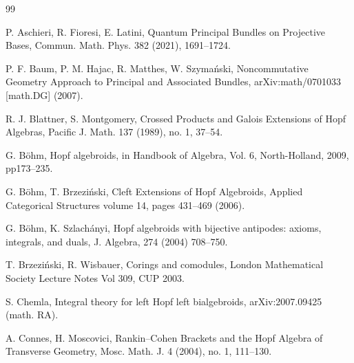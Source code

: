 \documentclass[a4paper,reqno]{amsart}
\numberwithin{equation}{section}
\theoremstyle{plain}
\theoremstyle{remark}
\numberwithin{equation}{section}
\begin{document}
\begin{thebibliography}{99}







P. Aschieri, R. Fioresi, E. Latini,
{Quantum Principal Bundles on Projective Bases},
Commun. Math. Phys. 382 (2021), 1691--1724.


P. F. Baum, P. M. Hajac, R. Matthes, W. Szyma{\'n}ski,
{Noncommutative Geometry Approach to Principal and Associated Bundles},
arXiv:math/0701033 [math.DG] (2007).

R. J. Blattner, S. Montgomery,
{Crossed Products and Galois Extensions of Hopf Algebras},
Pacific J. Math. 137 (1989), no. 1, 37--54.


G. B\"ohm,
{Hopf algebroids}, in Handbook of Algebra, Vol. 6,
North-Holland, 2009, pp173--235.

G. B\"ohm, T. Brzezi\'nski,
{Cleft Extensions of Hopf Algebroids}, Applied Categorical Structures volume 14, pages 431--469 (2006).

G. B\"ohm, K. Szlach\'anyi,
{Hopf algebroids with bijective antipodes:
axioms, integrals, and duals}, J. Algebra, 274 (2004) 708--750.

T. Brzezi\'nski, R. Wisbauer,
{Corings and comodules},
London Mathematical Society Lecture Notes Vol 309, CUP 2003.

S. Chemla,
{Integral theory for left Hopf left bialgebroids},
arXiv:2007.09425 (math. RA).

A. Connes, H. Moscovici,
{Rankin--Cohen Brackets and the Hopf Algebra of Transverse Geometry},
Mosc. Math. J. 4 (2004), no. 1, 111--130.



\end{thebibliography}
\end{document}
